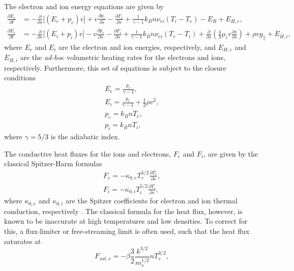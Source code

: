 %
\par The electron and ion energy equations are given by
\begin{align}
	\frac{\partial E_e}{\partial t} &= -\frac{\partial}{\partial s} \lbrack(E_e+p_e)v\rbrack+v\frac{\partial p_e}{\partial s} - \frac{\partial F_{e}}{\partial s} + \frac{1}{\gamma - 1}k_Bn\nu_{ei}(T_i-T_e) -E_R+E_{H,e}, \label{eq:1denergy_e} \\[0.5em]
	\frac{\partial E_i}{\partial t} &= -\frac{\partial }{\partial s}\lbrack(E_i+p_i)v\rbrack-v\frac{\partial p_e}{\partial s} - \frac{\partial F_{i}}{\partial s} + \frac{1}{\gamma - 1}k_Bn\nu_{ei}(T_e-T_i) + \frac{\partial}{\partial s}\left(\frac{4}{3}\mu_iv\frac{\partial v}{\partial s}\right) +\rho v g_{\parallel} + E_{H,i},\label{eq:1denergy_i}
\end{align}
where $E_e$ and $E_i$ are the electron and ion energies, respectively, and $E_{H,e}$ and $E_{H,i}$ are the \textit{ad-hoc} volumetric heating rates for the electrons and ions, respectively. Furthermore, this set of equations is subject to the closure conditions
\begin{align}
	E_e = \frac{p_e}{\gamma - 1}, \label{eq:ee_close} \\[0.5em]
	E_i = \frac{p_i}{\gamma - 1} + \frac{1}{2}\rho v^2, \label{eq:ei_close} \\[0.5em]
	p_e = k_BnT_e, \label{eq:pe_close} \\[0.5em]
	p_i = k_BnT_i, \label{eq:pi_close}
\end{align}
where $\gamma=5/3$ is the adiabatic index.
% 
\par The conductive heat fluxes for the ions and electrons, $F_e$ and $F_i$, are given by the classical Spitzer-Harm \citep{spitzer_transport_1953} formulas
\begin{align}
	F_e=-\kappa_{0,e}T_e^{5/2}\frac{\partial T_e}{\partial s}, \label{eq:1dhfluxe} \\[0.5em]
	F_i=-\kappa_{0,i}T_i^{5/2}\frac{\partial T_i}{\partial s}, \label{eq:1dhfluxi}
\end{align}
where $\kappa_{0,e}$ and $\kappa_{0,i}$ are the Spitzer coefficients for electron and ion thermal conduction, respectively \citep{bradshaw_influence_2013}. The classical formula for the heat flux, however, is known to be inaccurate at high temperatures and low densities. To correct for this, a flux-limiter or free-streaming limit is often used, such that the heat flux saturates at
\begin{equation}
	F_{sat,s} = -\beta\frac{3}{2}\frac{k^{3/2}}{m_s^{1/2}}nT_s^{3/2},
\end{equation}

